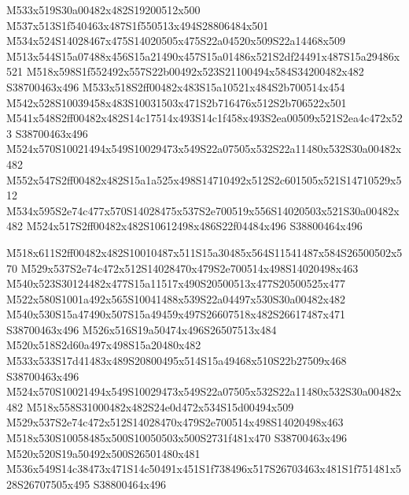 \documentclass{article}
\begin{document}
\begin{multicols}{2}
M533x519S30a00482x482S19200512x500 M537x513S1f540463x487S1f550513x494S28806484x501 M534x524S14028467x475S14020505x475S22a04520x509S22a14468x509 M513x544S15a07488x456S15a21490x457S15a01486x521S2df24491x487S15a29486x521 M518x598S1f552492x557S22b00492x523S21100494x584S34200482x482 S38700463x496 M533x518S2ff00482x483S15a10521x484S2b700514x454 M542x528S10039458x483S10031503x471S2b716476x512S2b706522x501 M541x548S2ff00482x482S14c17514x493S14c1f458x493S2ea00509x521S2ea4c472x523 S38700463x496 M524x570S10021494x549S10029473x549S22a07505x532S22a11480x532S30a00482x482 M552x547S2ff00482x482S15a1a525x498S14710492x512S2c601505x521S14710529x512 M534x595S2e74c477x570S14028475x537S2e700519x556S14020503x521S30a00482x482 M524x517S2ff00482x482S10612498x486S22f04484x496 S38800464x496

M518x611S2ff00482x482S10010487x511S15a30485x564S11541487x584S26500502x570 M529x537S2e74c472x512S14028470x479S2e700514x498S14020498x463 M540x523S30124482x477S15a11517x490S20500513x477S20500525x477 M522x580S1001a492x565S10041488x539S22a04497x530S30a00482x482 M540x530S15a47490x507S15a49459x497S26607518x482S26617487x471 S38700463x496 M526x516S19a50474x496S26507513x484 M520x518S2d60a497x498S15a20480x482 M533x533S17d41483x489S20800495x514S15a49468x510S22b27509x468 S38700463x496 M524x570S10021494x549S10029473x549S22a07505x532S22a11480x532S30a00482x482 M518x558S31000482x482S24e0d472x534S15d00494x509 M529x537S2e74c472x512S14028470x479S2e700514x498S14020498x463 M518x530S10058485x500S10050503x500S2731f481x470 S38700463x496 M520x520S19a50492x500S26501480x481 M536x549S14c38473x471S14c50491x451S1f738496x517S26703463x481S1f751481x528S26707505x495 S38800464x496


\end{multicols}
\end{document}
